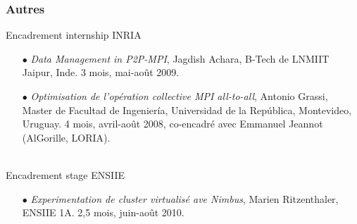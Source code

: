 \documentclass[11pt]{article}
\begin{document}
\subsubsection{Autres}
Encadrement internship INRIA
\smallskip
\begin{itemize}
\item[$\bullet$]  {\it Data Management in P2P-MPI}, Jagdish Achara, B-Tech de LNMIIT Jaipur, Inde. 3 mois, mai-août 2009. 
\item[$\bullet$]  {\it Optimisation de l'opération collective MPI all-to-all}, Antonio Grassi, Master de Facultad de Ingeniería, Universidad de la República, Montevideo, Uruguay. 4 mois, avril-août 2008, co-encadré avec Emmanuel Jeannot (AlGorille, LORIA).
\end{itemize}
~\\
Encadrement stage ENSIIE
\smallskip
\begin{itemize}
\item[$\bullet$]  {\it Experimentation de cluster virtualisé ave Nimbus}, Marien Ritzenthaler, ENSIIE 1A. 2,5 mois, juin-août 2010. 
\end{itemize}
~\\
\end{document}
